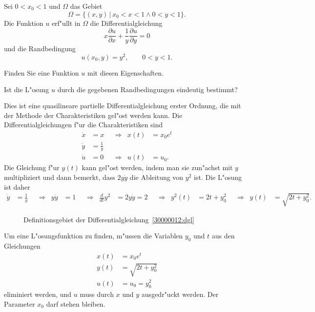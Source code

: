 Sei $0 < x_0 < 1$ und $\Omega$ das Gebiet
\[
\Omega=\{ (x,y)\,|\, x_0<x<1\wedge 0 < y < 1\}.
\]
Die Funktion $u$ erf"ullt in $\Omega$ die Differentialgleichung
\begin{equation}
x\frac{\partial u}{\partial x}
+
\frac1y\frac{\partial u}{\partial y}
=
0
\label{30000012:dgl}
\end{equation}
und die Randbedingung 
\[
u(x_0,y)=y^2,\qquad 0<y<1.
\]
\begin{teilaufgaben}
\item
Finden Sie eine Funktion $u$ mit diesen Eigenschaften.
\item
Ist die L"osung $u$ durch die gegebenen Randbedingungen eindeutig bestimmt?
\end{teilaufgaben}

\begin{loesung}
Dies ist eine quasilineare partielle Differentialgleichung erster Ordnung,
die mit der Methode der Charakteristiken gel"ost werden kann.
Die Differentialgleichungen f"ur die Charakteristiken sind
\[
\begin{aligned}
\dot x &= x       &&\Rightarrow&   x(t) &= x_0 e^t \\
\dot y &= \frac1y &&           &        &          \\
\dot u &= 0       &&\Rightarrow&   u(t) &= u_0.
\end{aligned}
\]
Die Gleichung f"ur $y(t)$ kann gel"ost werden, indem man sie zun"achst mit
$y$ multipliziert und dann bemerkt, dass $2y\dot y$ die Ableitung von $y^2$
ist.
Die L"osung ist daher
\begin{align*}
\dot y &= \frac1y
&&\Rightarrow&
y\dot y &= 1
&&\Rightarrow&
\frac{d}{dt}y^2&=2y\dot y=2
&&\Rightarrow&
y^2(t) &= 2t + y_0^2
&&\Rightarrow&
y(t)&=\sqrt{2t+y_0^2}.
\end{align*}
\begin{figure}
\centering
{}
\caption{Definitionsgebiet der Differentialgleichung~\ref{30000012:dgl}
\label{30000012:domain}}
\end{figure}
\begin{teilaufgaben}
\item
Um eine L"osungsfunktion zu finden, m"ussen die Variablen $y_0$ und $t$ aus den
Gleichungen
\begin{align*}
x(t) &= x_0e^t\\
y(t)&=\sqrt{2t+y_0^2}\\
u(t)&=u_0 = y_0^2
\end{align*}
eliminiert werden, und $u$ muss durch $x$ und $y$ ausgedr"uckt werden.
Der Parameter $x_0$ darf stehen bleiben.


\end{teilaufgaben}
\end{loesung}
